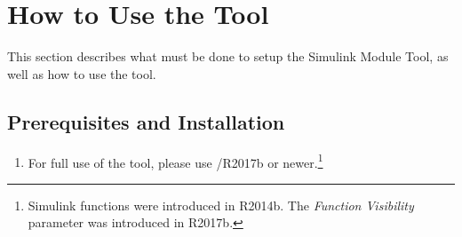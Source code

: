 \documentclass{article}
\makeatletter
\newcommand{\ToolName}{Simulink Module Tool\@\xspace}
\makeatother
\begin{document}
\section{How to Use the Tool}
This section describes what must be done to setup the \ToolName, as well as how to use the tool.

\subsection{Prerequisites and Installation}

\begin{enumerate}
	\item For full use of the tool, please use \matlab/\Simulink R2017b or newer.\footnote{Simulink functions were introduced in R2014b. The \emph{Function Visibility} parameter was introduced in R2017b.}


\end{enumerate}
\end{document}
